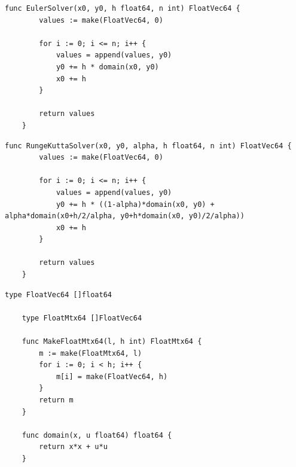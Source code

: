 \begin{lstlisting}[label=lst:eu,caption=Метод Эйлера]
	func EulerSolver(x0, y0, h float64, n int) FloatVec64 {
		values := make(FloatVec64, 0)
		
		for i := 0; i <= n; i++ {
			values = append(values, y0)
			y0 += h * domain(x0, y0)
			x0 += h
		}
		
		return values
	}
\end{lstlisting}

\begin{lstlisting}[label=lst:rk,caption=Метод Рунге --- Кутта]
	func RungeKuttaSolver(x0, y0, alpha, h float64, n int) FloatVec64 {
		values := make(FloatVec64, 0)
		
		for i := 0; i <= n; i++ {
			values = append(values, y0)
			y0 += h * ((1-alpha)*domain(x0, y0) + alpha*domain(x0+h/2/alpha, y0+h*domain(x0, y0)/2/alpha))
			x0 += h
		}
		
		return values
	}
\end{lstlisting}

\begin{lstlisting}[label=lst:utils,caption=Вспомогательные функции и типы]
	type FloatVec64 []float64
	
	type FloatMtx64 []FloatVec64
	
	func MakeFloatMtx64(l, h int) FloatMtx64 {
		m := make(FloatMtx64, l)
		for i := 0; i < h; i++ {
			m[i] = make(FloatVec64, h)
		}
		return m
	}
	
	func domain(x, u float64) float64 {
		return x*x + u*u
	}
\end{lstlisting}

